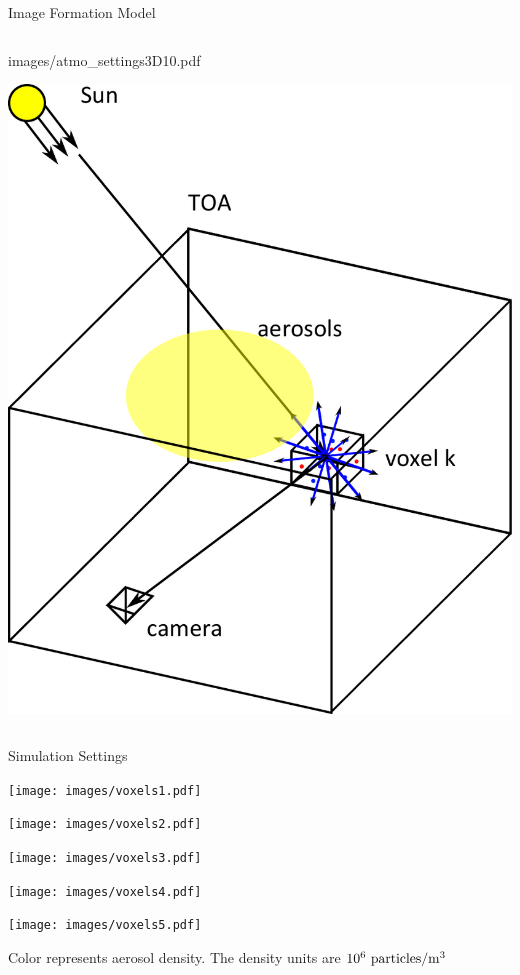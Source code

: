 \documentclass[compress,red,12pt]{beamer}
\begin{document}
\begin{frame}[label=formation-model]{Image Formation Model}
\begin{columns}[c]
\begin{overprint}
{{          {images/atmo_settings3D10.pdf}}}
       {\centerline{\includegraphics[width=\columnwidth]
          {images/atmo_settings3D11.pdf}}}
    \end{overprint}

  \end{columns}
\end{frame}


\begin{frame}[label=settings]{Simulation Settings}
  \begin{center}
    \begin{overlayarea}{\columnwidth}{8cm}
        {\centerline{\texttt{[image: images/voxels1.pdf]}}}
        {\centerline{\texttt{[image: images/voxels2.pdf]}}}
        {\centerline{\texttt{[image: images/voxels3.pdf]}}}
        {
          \hfill\hyperlink{air-density}{}  
          \centerline{\texttt{[image: images/voxels4.pdf]}}
        }
        {
          \hfill\hyperlink{typical-concentrations}{}  
          \centerline{\texttt{[image: images/voxels5.pdf]}}
          \begin{center}
            \tiny{Color represents aerosol density. The density units are $10^{6}~{\rm particles}/{\rm m}^3$}
          \end{center}
        }
    \end{overlayarea}
  \end{center}
\end{frame}
\end{document}
